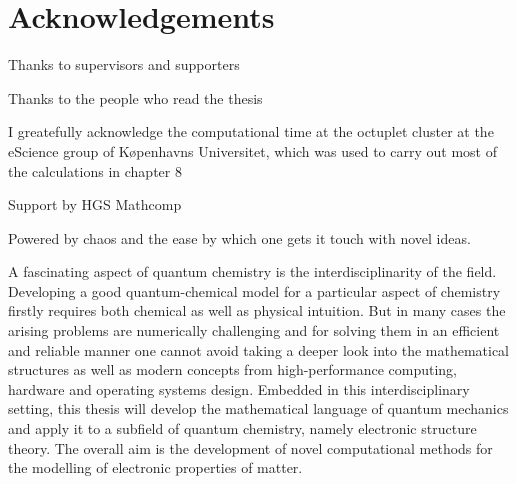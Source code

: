 \chapter*{Acknowledgements}

Thanks to supervisors and supporters

Thanks to the people who read the thesis


I greatefully acknowledge the computational time at the octuplet cluster at
the eScience group of Køpenhavns Universitet, which was used to carry out
most of the calculations in chapter 8

Support by HGS Mathcomp

Powered by chaos and the ease by which one gets it touch with novel ideas.




A fascinating aspect of quantum chemistry is the interdisciplinarity of the field.
Developing a good quantum-chemical model for a particular aspect of chemistry
firstly requires both chemical as well as physical intuition.
But in many cases the arising problems are numerically challenging
and for solving them in an efficient and reliable manner
one cannot avoid taking a deeper look into the mathematical structures
as well as modern concepts from high-performance computing,
hardware and operating systems design.
Embedded in this interdisciplinary setting,
this thesis will develop the mathematical language of quantum mechanics
and apply it to a subfield of quantum chemistry,
namely electronic structure theory.
The overall aim is the development of novel computational methods
for the modelling of electronic properties of matter.

